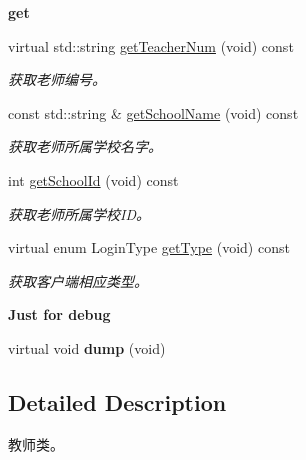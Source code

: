 \begin{Indent}{\bf get}\par
\begin{DoxyCompactItemize}
\item 
virtual std\-::string \hyperlink{classepTeacher_abbbb349a991b534ff97eb0c548581a95}{get\-Teacher\-Num} (void) const 
\begin{DoxyCompactList}\small\item\em 获取老师编号。 \end{DoxyCompactList}\item 
const std\-::string \& \hyperlink{classepTeacher_ad8cd0278bce52f10112d54a2d06ff6ed}{get\-School\-Name} (void) const 
\begin{DoxyCompactList}\small\item\em 获取老师所属学校名字。 \end{DoxyCompactList}\item 
int \hyperlink{classepTeacher_ac48d8046208640fabfeaa9cd424d34f0}{get\-School\-Id} (void) const 
\begin{DoxyCompactList}\small\item\em 获取老师所属学校\-I\-D。 \end{DoxyCompactList}\item 
virtual enum \-Login\-Type \hyperlink{classepTeacher_af4a8dcc9a51ae25c854bf223926cd8e2}{get\-Type} (void) const 
\begin{DoxyCompactList}\small\item\em 获取客户端相应类型。 \end{DoxyCompactList}\end{DoxyCompactItemize}
\end{Indent}
\begin{Indent}{\bf \-Just for debug}\par
\begin{DoxyCompactItemize}
\item 
\hypertarget{classepTeacher_adbd31dda242a312ff786c0f8809c7be1}{virtual void {\bfseries dump} (void)}\label{classepTeacher_adbd31dda242a312ff786c0f8809c7be1}

\end{DoxyCompactItemize}
\end{Indent}


\subsection{\-Detailed \-Description}
教师类。 

